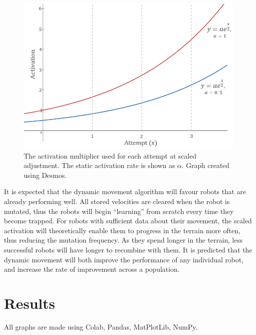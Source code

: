 \documentclass{article}
\begin{document}
\begin{enumerate}
\begin{figure}[H]
\centering
\includegraphics[scale=0.8]{activationFunction}
\caption{The activation multiplier used for each attempt at scaled adjustment. The static activation rate is shown as $\alpha$. Graph created using Desmos. \citep{graphs}}
\end{figure}
\end{enumerate}

It is expected that the dynamic movement algorithm will favour robots that are already performing well. All stored velocities are cleared when the robot is mutated, thus the robots will begin “learning” from scratch every time they become trapped. For robots with sufficient data about their movement, the scaled activation will theoretically enable them to progress in the terrain more often, thus reducing the mutation frequency. As they spend longer in the terrain, less successful robots will have longer to recombine with them. It is predicted that the dynamic movement will both improve the performance of any individual robot, and increase the rate of improvement across a population. \\

\newpage
\section{Results}
All graphs are made using Colab, \citep{colab} Pandas, \citep{pd} MatPlotLib, \citep{plt} NumPy. \citep{np}
\end{document}
